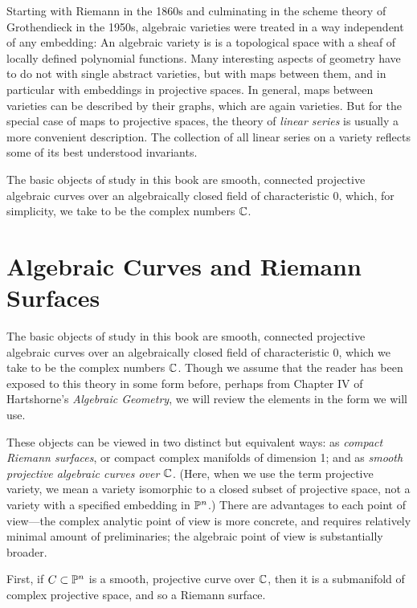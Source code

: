 Starting with Riemann in the 1860s and culminating in the scheme theory of Grothendieck in the 1950s, algebraic varieties were treated in a way independent of any embedding: An algebraic variety is is a topological space with a sheaf of locally
defined polynomial functions. Many interesting aspects of geometry have to do not with single abstract varieties, but with maps between them, and in particular with embeddings in projective spaces. In general, maps between varieties can be described by their graphs, which are again varieties.  But for the special case of maps to projective spaces, the theory of \emph{linear series} is usually a more convenient description. The collection of all linear series on a variety reflects some of its best understood invariants. 

The basic objects of study in this book are smooth, connected projective algebraic curves over an algebraically closed field of characteristic 0, which, for simplicity, we take to be the complex numbers ${\mathbb C}$.

\section{Algebraic Curves and Riemann Surfaces}

The basic objects of study in this book are smooth, connected projective algebraic curves over an algebraically closed field of characteristic 0, which we take to be the complex numbers ${\mathbb C}$. Though we assume that the reader has been exposed to this theory in some form before, perhaps from Chapter IV of Hartshorne's {\it Algebraic Geometry}, we will review the elements  in the form we will use. 

These objects can be viewed in two distinct but equivalent ways: as \emph{compact Riemann surfaces}, or compact complex manifolds of dimension 1; and as \emph{smooth projective algebraic curves over ${\mathbb C}$}. (Here, when we use the term projective variety, we mean a variety isomorphic to a closed subset of projective space, not a variety with a specified embedding in ${\mathbb P}^n$.) There are advantages to each point of view---the complex analytic point of view is more concrete, and requires relatively minimal amount of preliminaries; the algebraic point of view is substantially broader. 

First, if $C \subset {\mathbb P}^n$ is a smooth, projective curve over ${\mathbb C}$, then it is a submanifold of complex projective space, and so a Riemann surface. 

